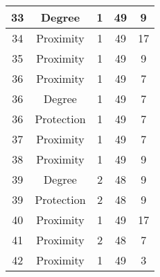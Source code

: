 \documentclass[results.tex]{subfiles}
\begin{document}
\begin{center}
\begin{tabular}{| c || c | c | c | c |}
            \hline
            33                      & Degree                       & 1                      & 49                      & 9                    \\
            \hline
            34                      & Proximity                    & 1                      & 49                      & 17                   \\
            \hline
            35                      & Proximity                    & 1                      & 49                      & 9                    \\
            \hline
            36                      & Proximity                    & 1                      & 49                      & 7                    \\
            \hline
            36                      & Degree                       & 1                      & 49                      & 7                    \\
            \hline
            36                      & Protection                   & 1                      & 49                      & 7                    \\
            \hline
            37                      & Proximity                    & 1                      & 49                      & 7                    \\
            \hline
            38                      & Proximity                    & 1                      & 49                      & 9                    \\
            \hline
            39                      & Degree                       & 2                      & 48                      & 9                    \\
            \hline
            39                      & Protection                   & 2                      & 48                      & 9                    \\
            \hline
            40                      & Proximity                    & 1                      & 49                      & 17                   \\
            \hline
            41                      & Proximity                    & 2                      & 48                      & 7                    \\
            \hline
            42                      & Proximity                    & 1                      & 49                      & 3                    \\

\end{tabular}
\end{center}
\end{document}
